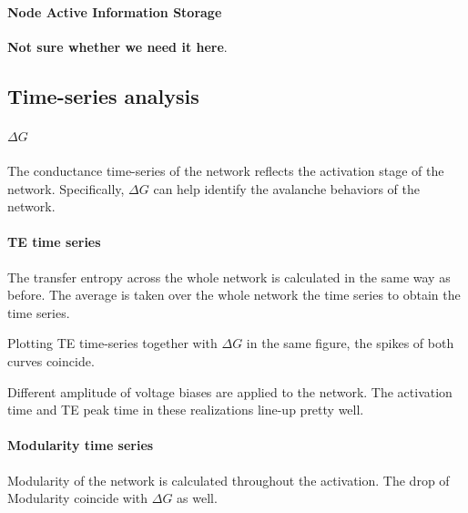 \documentclass[%
 reprint,
 amsmath,amssymb,
 aps,
]{revtex4-2}
\begin{document}
\paragraph{Node Active Information Storage}
\textbf{Not sure whether we need it here}.

\subsection{Time-series analysis}

\paragraph{$\Delta G$}

The conductance time-series of the network reflects the activation stage of the network. Specifically, $\Delta G$ can help identify the avalanche behaviors of the network.


\paragraph{TE time series}

The transfer entropy across the whole network is calculated in the same way as before. The average is taken over the whole network the time series to obtain the time series.

Plotting TE time-series together with $\Delta G$ in the same figure, the spikes of both curves coincide.

Different amplitude of voltage biases are applied to the network. The activation time and TE peak time in these realizations line-up pretty well.

\paragraph{Modularity time series}

Modularity of the network is calculated throughout the activation. The drop of Modularity coincide with $\Delta G$ as well. 
\end{document}
